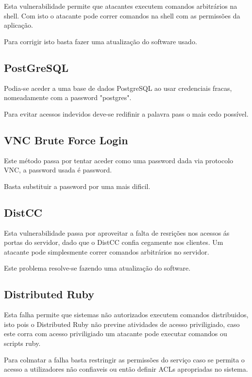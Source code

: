 \par Esta vulnerabilidade permite que atacantes executem comandos arbitrários na shell. Com isto o atacante pode correr comandos na shell com as permissões da aplicação.
\par Para corrigir isto basta fazer uma atualização do software usado.

\subsection{PostGreSQL}

Podia-se aceder a uma base de dados PostgreSQL ao usar credenciais fracas, nomeadamente com a password "postgres".
\par Para evitar acessos indevidos deve-se redifinir a palavra pass o mais cedo possível. 


\subsection{VNC Brute Force Login}

\par Este método passa por tentar aceder como uma password dada via protocolo VNC, a password usada é password.
\par Basta substituir a password por uma mais dificil.


\subsection{DistCC}

\par Esta vulnerabilidade passa por aproveitar a falta de resrições nos acessos ás portas do servidor, dado que o DistCC confia cegamente nos clientes. Um atacante pode simplesmente correr comandos arbitrários no servidor.
\par Este problema resolve-se fazendo uma atualização do software.


\subsection{Distributed Ruby}

\par Esta falha permite que sistemas não autorizados executem comandos distribuidos, isto pois o Distributed Ruby não previne atividades de acesso priviligiado, caso este corra com acesso priviligiado um atacante pode executar comandos ou scripts ruby.
\par Para colmatar a falha basta restringir as permissões do serviço caso se permita o acesso a utilizadores não confiaveis ou então definir ACLs apropriadas no sistema.


